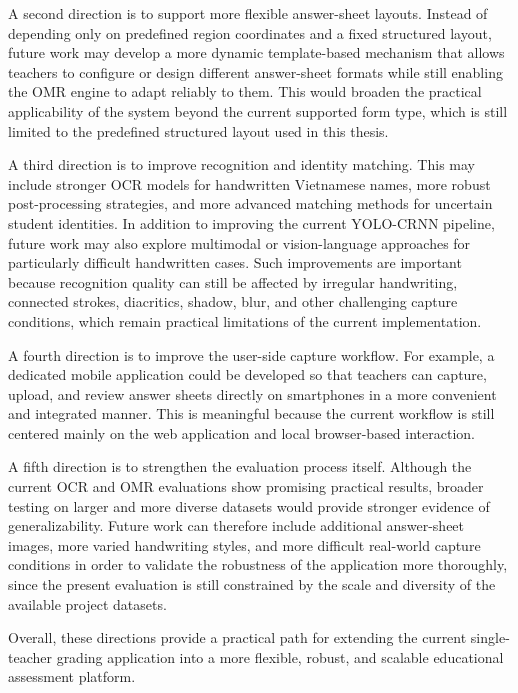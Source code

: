 \documentclass[../Main.tex]{subfiles}
\begin{document}
A second direction is to support more flexible answer-sheet layouts. Instead of
depending only on predefined region coordinates and a fixed structured layout,
future work may develop a more dynamic template-based mechanism that allows
teachers to configure or design different answer-sheet formats while still
enabling the OMR engine to adapt reliably to them. This would broaden the
practical applicability of the system beyond the current supported form type,
which is still limited to the predefined structured layout used in this thesis.

A third direction is to improve recognition and identity matching. This may
include stronger OCR models for handwritten Vietnamese names, more robust
post-processing strategies, and more advanced matching methods for uncertain
student identities. In addition to improving the current YOLO-CRNN pipeline,
future work may also explore multimodal or vision-language approaches for
particularly difficult handwritten cases. Such improvements are important
because recognition quality can still be affected by irregular handwriting,
connected strokes, diacritics, shadow, blur, and other challenging capture
conditions, which remain practical limitations of the current implementation.

A fourth direction is to improve the user-side capture workflow. For example, a
dedicated mobile application could be developed so that teachers can capture,
upload, and review answer sheets directly on smartphones in a more convenient
and integrated manner. This is meaningful because the current workflow is still
centered mainly on the web application and local browser-based interaction.

A fifth direction is to strengthen the evaluation process itself. Although the
current OCR and OMR evaluations show promising practical results, broader
testing on larger and more diverse datasets would provide stronger evidence of
generalizability. Future work can therefore include additional answer-sheet
images, more varied handwriting styles, and more difficult real-world capture
conditions in order to validate the robustness of the application more
thoroughly, since the present evaluation is still constrained by the scale and
diversity of the available project datasets.

Overall, these directions provide a practical path for extending the current
single-teacher grading application into a more flexible, robust, and scalable
educational assessment platform.
\end{document}
